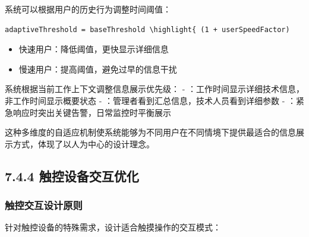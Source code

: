 系统可以根据用户的历史行为调整时间阈值：

\begin{lstlisting}[style=javascript]
adaptiveThreshold = baseThreshold \highlight{ (1 + userSpeedFactor)
\end{lstlisting}

\begin{itemize}
\tightlist
\item
  快速用户：降低阈值，更快显示详细信息
\item
  慢速用户：提高阈值，避免过早的信息干扰
\end{itemize}


系统根据当前工作上下文调整信息展示优先级： - ：工作时间显示详细技术信息，非工作时间显示概要状态 - ：管理者看到汇总信息，技术人员看到详细参数 - ：紧急响应时突出关键告警，日常监控时平衡展示

这种多维度的自适应机制使系统能够为不同用户在不同情境下提供最适合的信息展示方式，体现了以人为中心的设计理念。

\hypertarget{ux89e6ux63a7ux8bbeux5907ux4ea4ux4e92ux4f18ux5316}{%
\subsection{7.4.4 触控设备交互优化}\label{ux89e6ux63a7ux8bbeux5907ux4ea4ux4e92ux4f18ux5316}}

\hypertarget{ux89e6ux63a7ux4ea4ux4e92ux8bbeux8ba1ux539fux5219}{%
\subsubsection{触控交互设计原则}\label{ux89e6ux63a7ux4ea4ux4e92ux8bbeux8ba1ux539fux5219}}


针对触控设备的特殊需求，设计适合触摸操作的交互模式：

